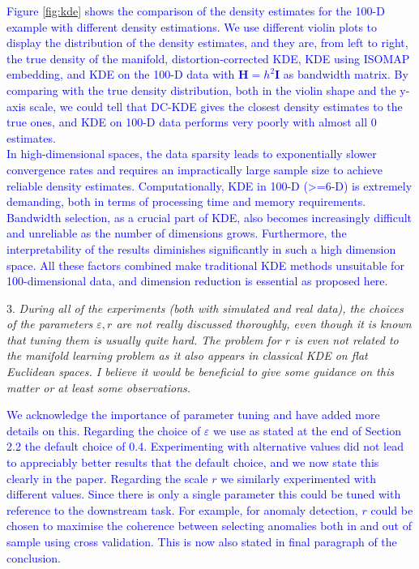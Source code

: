 \documentclass{article}
\begin{document}
   \textcolor{blue}{
   Figure \ref{fig:kde} shows the comparison of the density estimates for the 100-D example with different density estimations. We use different violin plots to display the distribution of the density estimates, and they are, from left to right, the true density of the manifold, distortion-corrected KDE, KDE using ISOMAP embedding, and KDE on the 100-D data with $\mathbf{H} = h^2 \mathbf{I}$ as bandwidth matrix. By comparing with the true density distribution, both in the violin shape and the y-axis scale, we could tell that DC-KDE gives the closest density estimates to the true ones, and KDE on 100-D data performs very poorly with almost all 0 estimates. \\
   In high-dimensional spaces, the data sparsity leads to exponentially slower convergence rates and requires an impractically large sample size to achieve reliable density estimates. Computationally, KDE in 100-D (>=6-D) is extremely demanding, both in terms of processing time and memory requirements. Bandwidth selection, as a crucial part of KDE, also becomes increasingly difficult and unreliable as the number of dimensions grows. Furthermore, the interpretability of the results diminishes significantly in such a high dimension space. All these factors combined make traditional KDE methods unsuitable for 100-dimensional data, and dimension reduction is essential as proposed here.
   }

3. \textit{During all of the experiments (both with simulated and real data), the choices of the parameters \(\varepsilon, r\) are not really discussed thoroughly, even though it is known that tuning them is usually quite hard. The problem for \(r\) is even not related to the manifold learning problem as it also appears in classical KDE on flat Euclidean spaces. I believe it would be beneficial to give some guidance on this matter or at least some observations.}

   \textcolor{blue}{We acknowledge the importance of parameter tuning and have added more details on this. Regarding the choice of \(\varepsilon\) we use as stated at the end of Section 2.2 the default choice of 0.4. Experimenting with alternative values did not lead to appreciably better results that the default choice, and we now state this clearly in the paper. Regarding the scale $r$ we similarly experimented with different values. Since there is only a single parameter this could be tuned with reference to the downstream task. For example, for anomaly detection, $r$ could be chosen to maximise the coherence between selecting anomalies both in and out of sample using cross validation. This is now also stated in final paragraph of the conclusion.
   }
\end{document}
